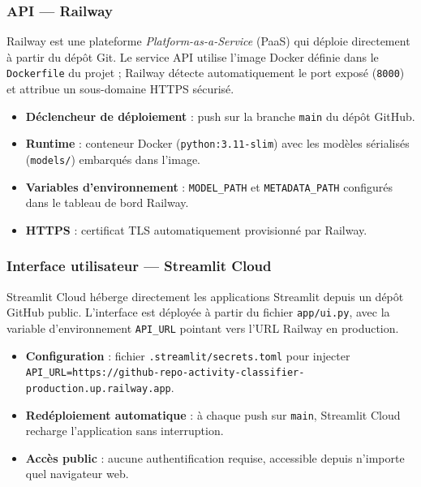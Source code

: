 \documentclass[12pt,a4paper]{article}
\begin{document}
\subsubsection{API --- Railway}

Railway est une plateforme \textit{Platform-as-a-Service} (PaaS) qui déploie directement à
partir du dépôt Git. Le service API utilise l'image Docker définie dans le \texttt{Dockerfile}
du projet ; Railway détecte automatiquement le port exposé (\texttt{8000}) et attribue un
sous-domaine HTTPS sécurisé.

\begin{itemize}[noitemsep]
  \item \textbf{Déclencheur de déploiement} : push sur la branche \texttt{main} du dépôt GitHub.
  \item \textbf{Runtime} : conteneur Docker (\texttt{python:3.11-slim}) avec les modèles
    sérialisés (\texttt{models/}) embarqués dans l'image.
  \item \textbf{Variables d'environnement} : \texttt{MODEL\_PATH} et \texttt{METADATA\_PATH}
    configurés dans le tableau de bord Railway.
  \item \textbf{HTTPS} : certificat TLS automatiquement provisionné par Railway.
\end{itemize}

\subsubsection{Interface utilisateur --- Streamlit Cloud}

Streamlit Cloud héberge directement les applications Streamlit depuis un dépôt GitHub public.
L'interface est déployée à partir du fichier \texttt{app/ui.py}, avec la variable d'environnement
\texttt{API\_URL} pointant vers l'URL Railway en production.

\begin{itemize}[noitemsep]
  \item \textbf{Configuration} : fichier \texttt{.streamlit/secrets.toml} pour injecter
    \texttt{API\_URL=https://github-repo-activity-classifier-production.up.railway.app}.
  \item \textbf{Redéploiement automatique} : à chaque push sur \texttt{main}, Streamlit Cloud
    recharge l'application sans interruption.
  \item \textbf{Accès public} : aucune authentification requise, accessible depuis n'importe quel
    navigateur web.
\end{itemize}
\end{document}

